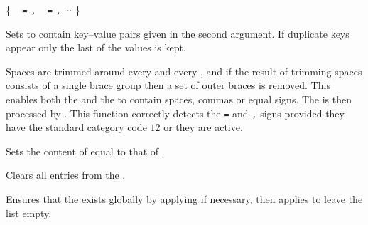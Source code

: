 \documentclass[oneside]{book}
\begin{document}
\begin{function}{\PropSetFromKeyval}
\begin{syntax}
 
\{
~  \verb|=|  \verb|,|
~  \verb|=|  \verb|,| $\cdots$
\}
\end{syntax}
Sets  to contain key--value pairs given in the second
argument.  If duplicate keys appear only the last of the values is kept.

Spaces are trimmed around every  and every ,
and if the result of trimming spaces consists of a single brace
group then a set of outer braces is removed.  This enables both the
 and the  to contain spaces, commas or equal
signs.  The  is then processed by .
This function correctly detects the \verb|=| and \verb|,| signs provided they
have the standard category code $12$ or they are active.
\begin{codehigh}
\PropSetFromKeyval {}
\end{codehigh}
\end{function}

\begin{function}{\PropSetEq}
\begin{syntax}
  
\end{syntax}
Sets the content of  equal to that of
.
\begin{codehigh}
\PropSetFromKeyval {}
\PropSetEq \lTmpbProp \lTmpaProp
\PropVarLog \lTmpbProp
\end{codehigh}
\end{function}

\begin{function}{\PropClear}
\begin{syntax}
 
\end{syntax}
Clears all entries from the .
\begin{codehigh}
\PropClear \lTmpaProp
\end{codehigh}
\end{function}

\begin{function}{\PropClearNew}
\begin{syntax}
 
\end{syntax}
Ensures that the  exists globally by applying 
if necessary, then applies  to leave the list empty.
\begin{codehigh}
\PropClearNew \lFooSomeProp
\end{codehigh}
\end{function}
\end{document}
